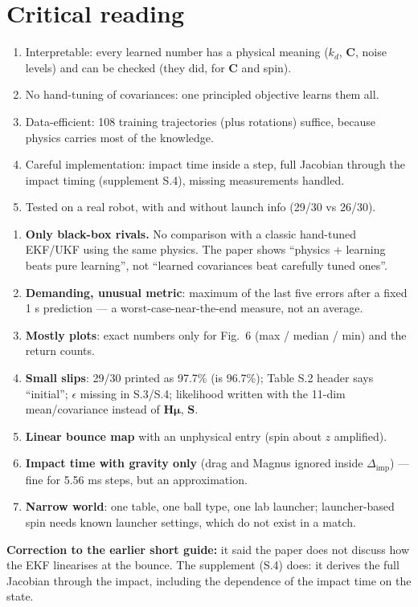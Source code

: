 \documentclass[11pt,a4paper]{article}
\newcommand{\mmu}{\boldsymbol{\mu}}
\begin{document}
\section{Critical reading}
\begin{idea}[Strengths]
\begin{enumerate}
\item Interpretable: every learned number has a physical meaning ($k_d$, $\mathbf C$, noise levels) and can be checked (they did, for $\mathbf C$ and spin).
\item No hand-tuning of covariances: one principled objective learns them all.
\item Data-efficient: 108 training trajectories (plus rotations) suffice, because physics carries most of the knowledge.
\item Careful implementation: impact time inside a step, full Jacobian through the impact timing (supplement S.4), missing measurements handled.
\item Tested on a real robot, with and without launch info (29/30 vs 26/30).
\end{enumerate}
\end{idea}
\begin{warn}
\begin{enumerate}
\item \textbf{Only black-box rivals.} No comparison with a classic hand-tuned EKF/UKF using the same physics. The paper shows ``physics + learning beats pure learning'', not ``learned covariances beat carefully tuned ones''.
\item \textbf{Demanding, unusual metric}: maximum of the last five errors after a fixed 1 s prediction --- a worst-case-near-the-end measure, not an average.
\item \textbf{Mostly plots}: exact numbers only for Fig.~6 (max / median / min) and the return counts.
\item \textbf{Small slips}: 29/30 printed as 97.7\% (is 96.7\%); Table S.2 header says ``initial''; $\epsilon$ missing in S.3/S.4; likelihood written with the 11-dim mean/covariance instead of $\mathbf H\mmu$, $\mathbf S$.
\item \textbf{Linear bounce map} with an unphysical entry (spin about $z$ amplified).
\item \textbf{Impact time with gravity only} (drag and Magnus ignored inside $\Delta_{\text{imp}}$) --- fine for 5.56 ms steps, but an approximation.
\item \textbf{Narrow world}: one table, one ball type, one lab launcher; launcher-based spin needs known launcher settings, which do not exist in a match.
\end{enumerate}
\end{warn}
\textbf{Correction to the earlier short guide:} it said the paper does not discuss how the EKF linearises at the bounce. The supplement (S.4) does: it derives the full Jacobian through the impact, including the dependence of the impact time on the state.
\end{document}
